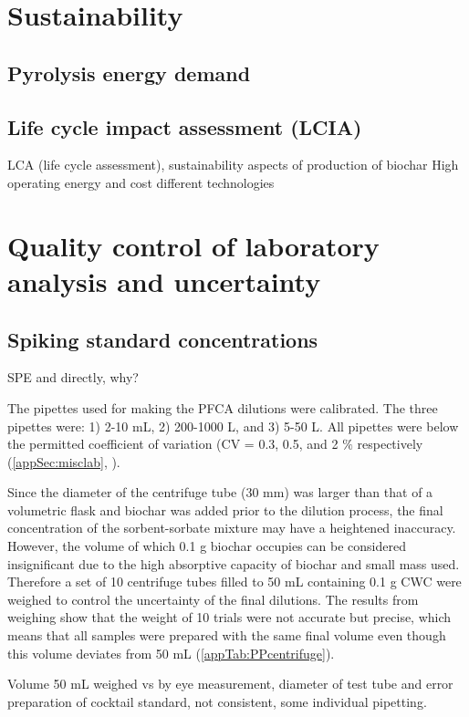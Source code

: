 \section{Sustainability}
\subsection{Pyrolysis energy demand}
\subsection{Life cycle impact assessment (LCIA)}
LCA (life cycle assessment), sustainability aspects of production of biochar
High operating energy and cost different technologies \citep{Alhashimi2017}

\section{Quality control of laboratory analysis and uncertainty}

\subsection{Spiking standard concentrations}
SPE and directly, why?

The pipettes used for making the PFCA dilutions were calibrated. The three pipettes were: 1) 2-10 mL, 2) 200-1000 \textmu L, and 3) 5-50 \textmu L. All pipettes were below the permitted coefficient of variation (CV = 0.3, 0.5, and 2 $\%$ respectively (\cref{appSec:misclab}, ).

Since the diameter of the centrifuge tube (30 mm) was larger than that of a volumetric flask and biochar was added prior to the dilution process, the final concentration of the sorbent-sorbate mixture may have a heightened inaccuracy. However, the volume of which 0.1 g biochar occupies can be considered insignificant due to the high absorptive capacity of biochar and small mass used. Therefore a set of 10 centrifuge tubes filled to 50 mL containing 0.1 g CWC were weighed to control the uncertainty of the final dilutions. The results from weighing show that the weight of 10 trials were not accurate but precise, which means that all samples were prepared with the same final volume even though this volume deviates from 50 mL (\cref{appTab:PPcentrifuge}). 

Volume 50 mL weighed vs by eye measurement, diameter of test tube and error
preparation of cocktail standard, not consistent, some individual pipetting. 

